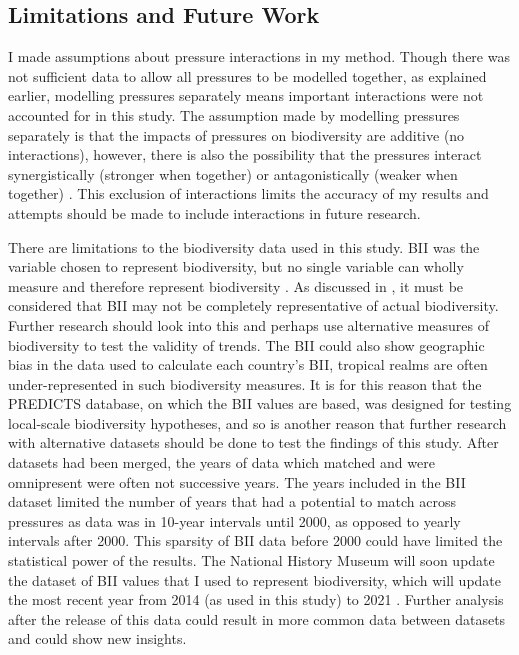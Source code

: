 \documentclass[11pt, a4paper, titlepage]{article}
\begin{document}
	\subsection*{Limitations and Future Work} 
	
	I made assumptions about pressure interactions in my method. Though there was not sufficient data to allow all pressures to be modelled together, as explained earlier, modelling pressures separately means important interactions \citep{hansen2001global} were not accounted for in this study. The assumption made by modelling pressures separately is that the impacts of pressures on biodiversity are additive (no interactions),  however, there is also the possibility that the pressures interact synergistically (stronger when together) or antagonistically (weaker when together) \citep{bowler2020mapping}. This exclusion of interactions limits the accuracy of my results and attempts should be made to include interactions in future research.
	
	
	There are limitations to the biodiversity data used in this study. BII was the variable chosen to represent biodiversity, but no single variable can wholly measure and therefore represent biodiversity \citep{secretariat2014global}.  As discussed in \citet{goethem2021biodiversity}, it must be considered that BII may not be completely representative of actual biodiversity. Further research should look into this and perhaps use alternative measures of biodiversity to test the validity of trends. The BII could also show geographic bias in the data used to calculate each country's BII, tropical realms are often under-represented \citep{collen2008tropical} in such biodiversity measures. It is for this reason that the PREDICTS database, on which the BII values are based, was designed for testing local-scale biodiversity hypotheses, and so is another reason that further research with alternative datasets should be done to test the findings of this study. After datasets had been merged, the years of data which matched and were omnipresent were often not successive years. The years included in the BII dataset limited the number of years that had a potential to match across pressures as data was in 10-year intervals until 2000, as opposed to yearly intervals after 2000. This sparsity of BII data before 2000 could have limited the statistical power of the results. The National History Museum will soon update the dataset of BII values that I used to represent biodiversity, which will update the most recent year from 2014 (as used in this study) to 2021 \citep{nhm2021}. Further analysis after the release of this data could result in more common data between datasets and could show new insights.
	
\end{document}
